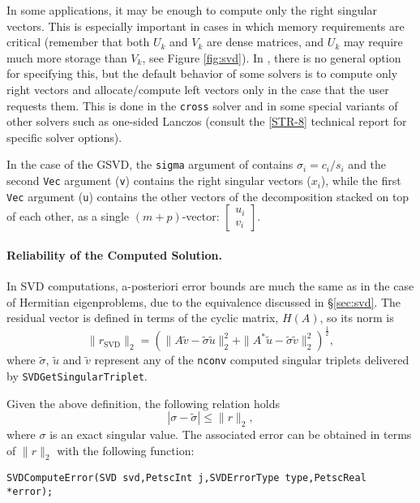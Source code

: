 In some applications, it may be enough to compute only the right singular vectors. This is especially important in cases in which memory requirements are critical (remember that both $U_k$ and $V_k$ are dense matrices, and $U_k$ may require much more storage than $V_k$, see Figure \ref{fig:svd}). In \slepc, there is no general option for specifying this, but the default behavior of some solvers is to compute only right vectors and allocate/compute left vectors only in the case that the user requests them. This is done in the \texttt{cross} solver and in some special variants of other solvers such as one-sided Lanczos (consult the \hyperlink{str}{[STR-8]} technical report for specific solver options).

In the case of the GSVD, the \texttt{sigma} argument of  contains $\sigma_i=c_i/s_i$ and the second \texttt{Vec} argument (\texttt{v}) contains the right singular vectors ($x_i$), while the first \texttt{Vec} argument (\texttt{u}) contains the other vectors of the decomposition stacked on top of each other, as a single $(m+p)$-vector: $\begin{bmatrix}u_i\\v_i\end{bmatrix}$.

\paragraph{Reliability of the Computed Solution.}

In SVD computations, a-posteriori error bounds are much the same as in the case of Hermitian eigenproblems, due to the equivalence discussed in \S\ref{sec:svd}. The residual vector is defined in terms of the cyclic matrix, $H(A)$, so its norm is
\begin{equation}
\|r_\mathrm{SVD}\|_2=\left(\|A\tilde{v}-\tilde{\sigma}\tilde{u}\|_2^2+\|A^*\tilde{u}-\tilde{\sigma}\tilde{v}\|_2^2\right)^{\frac{1}{2}},
\end{equation}
where $\tilde{\sigma}$, $\tilde{u}$ and $\tilde{v}$ represent any of the \texttt{nconv} computed singular triplets delivered by \texttt{SVDGetSingularTriplet}.

Given the above definition, the following relation holds
\begin{equation}
|\sigma-\tilde{\sigma}|\leq \|r\|_2,
\end{equation}
where $\sigma$ is an exact singular value. The associated error can be obtained in terms of $\|r\|_2$ with the following function:
	\begin{Verbatim}[fontsize=\small]
	SVDComputeError(SVD svd,PetscInt j,SVDErrorType type,PetscReal *error);
	\end{Verbatim}


